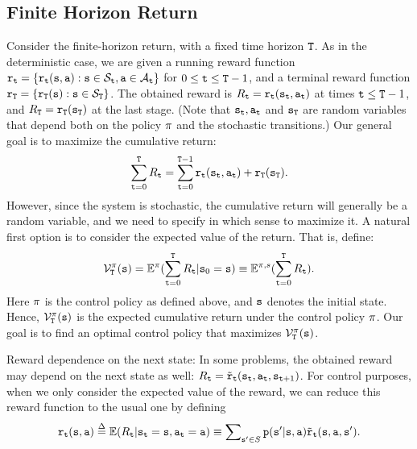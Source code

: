 \subsection{Finite Horizon Return}
Consider the finite-horizon return, with a fixed time horizon
${\tt T}$. As in the deterministic case, we are given a running
reward function ${{\tt r}_{\tt t}} = \{
{{\tt r}_{\tt t}}({\tt s},{\tt a}):{\tt s} \in {\mathcal{S}_{\tt t}},{\tt a}
\in {\mathcal{A}_{\tt t}}\} $ for $0 \le {\tt t} \le {\tt T} -1$, and a
terminal reward function ${{\tt r}_{\tt T}} = \{
{{\tt r}_{\tt T}}({\tt s}):{\tt s} \in {\mathcal{S}_{\tt T}}\} $.  The
obtained reward is  $R_{\tt t} =
{{\tt r}_{\tt t}}({{\tt s}_{\tt t}},{{\tt a}_{\tt t}})$ at times ${\tt t}
\le {\tt T} -1$, and ${R_{\tt T}} =
{{\tt r}_{\tt T}}({{\tt s}_{\tt T}})$ at the last stage. (Note
that ${\tt s}_{\tt t},{\tt a}_{\tt t}$ and ${\tt s}_{\tt T}$ are
random variables that depend both on the policy $\pi$ and the
stochastic transitions.)
 Our
general goal is to maximize the cumulative return:
\[
\sum\limits_{{\tt t} = 0}^{\tt T} {{R_{\tt t}}}  = \sum\limits_{{\tt t} = 0}^{{\tt T} -1}
{{{\tt r}_{\tt t}}({{\tt s}_{\tt t}},{{\tt a}_{\tt t}}) +
{{\tt r}_{\tt T}}({{\tt s}_{\tt T}})} .
\]
However, since the system is
stochastic, the cumulative return will generally be a random variable, and we
need to specify in which sense to maximize it. A natural first
option is to consider the expected value of the return. That is,
define:
\[\mathcal{V}_{\tt T}^\pi ({\tt s}) = {\mathbb{E}^\pi }(\sum\limits_{{\tt t} = 0}^{\tt T} {{R_{\tt t}}} |{{\tt s}_0} = {\tt s}) \equiv {\ensuremath{\mathbb{E}}^{\pi,s}}(\sum\limits_{{\tt t} = 0}^{\tt T} {{R_{\tt t}}} ) .\]
Here $\pi $ is the control policy as defined above, and ${\tt s}$
denotes the initial state. Hence,  $\mathcal{V}_{\tt T}^\pi
({\tt s})$ is the expected cumulative return under the control policy
$\pi $.  Our goal is to find an optimal control policy that
maximizes $\mathcal{V}_{\tt T}^\pi
 ({\tt s})$.

\begin{remark}
    Reward dependence on the next state:  In some problems, the obtained reward may depend on the next state as well: ${R_{\tt t}} = {\tilde {{\tt r}}_{\tt t}}({{\tt s}_{\tt t}},{{\tt a}_{\tt t}},{{\tt s}_{{\tt t} + 1}})$.  For control purposes, when we only consider the expected value of the reward, we can reduce this reward function to the usual one by defining
\[{\reward_\ttime}(\state,\action) \buildrel \Delta \over = \E({R_\ttime}|{\state_\ttime} = \state,{\action_\ttime} = \action) \equiv \sum\nolimits_{\state' \in S} {\transitionprob(\state'|\state,\action){{\tilde \reward}_\ttime}(} \state,\action,\state').\]
\end{remark}


